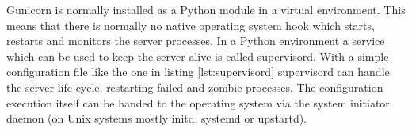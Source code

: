 \documentclass[BachelorPaper]{subfiles}
\begin{document}
Gunicorn is normally installed as a Python module in a virtual environment. This means that there is normally no native operating system hook which starts, restarts and monitors the server processes. In a Python environment a service which can be used to keep the server alive is called supervisord. With a simple configuration file like the one in listing \ref{lst:supervisord} supervisord can handle the server life-cycle, restarting failed and zombie processes. The configuration execution itself can be handed to the operating system via the system initiator daemon (on Unix systems mostly initd, systemd or upstartd).\\


\end{document}
